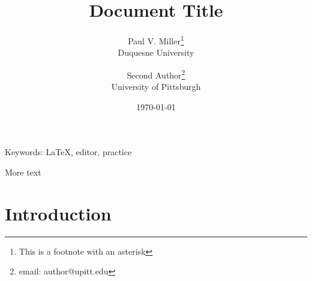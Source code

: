 \documentclass[11pt]{article}
\title{Document Title}
\author{Paul V. Miller\thanks{This is a footnote with an asterisk}\\Duquesne University \and Second Author\thanks{email: author@upitt.edu}\\University of Pittsburgh}
\date{\today}
\begin{document}
\maketitle

\begin{abstract}
    \lipsum[7]
\end{abstract}

Keywords: LaTeX, editor, practice

More text

\iffalse
A lot of text here will be ignored
\fi


\section{Introduction}

\lipsum[1-2]

\begin{comment}
This is another large comment
\end{comment}
\end{document}
